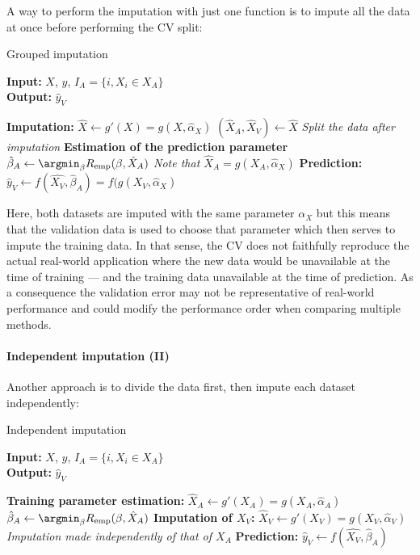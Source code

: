 A way to perform the imputation with just one function is to impute all the data at once before performing the CV split:
\begin{algorithm}[H]
	\caption{Grouped imputation}
	\hspace*{\algorithmicindent} \textbf{Input:} $X$, $y$, $I_A=\{i, X_i \in X_A\}$ \\
 	\hspace*{\algorithmicindent} \textbf{Output:} $\hat{y}_V$
	\begin{algorithmic}[1]
		\State \textbf{Imputation:}
		\Indstate $\hat{X} \leftarrow g'(X) = g(X, \hat{\alpha}_X)$ 
		\Indstate $(\hat{X}_A, \hat{X}_V) \leftarrow \hat{X}$ \Comment \emph{Split the data after imputation}
		\State \textbf{Estimation of the prediction parameter}
		\Indstate $\hat{\beta}_A \leftarrow \argmin_{\beta} R_{\text{emp}}(\beta,\hat{X}_A)$ \Comment \emph{Note that $\hat{X}_A = g(X_A, \hat{\alpha}_X)$}
		\State \textbf{Prediction:}
		\Indstate $\hat{y}_V \leftarrow f(\hat{X_V}, \hat{\beta}_A) = f(g(X_V, \hat{\alpha}_X)$
	\end{algorithmic}
\end{algorithm}

Here, both datasets are imputed with the same parameter $\alpha_X$ but this means that the validation data is used to choose that parameter which then serves to impute the training data. In that sense, the CV does not faithfully reproduce the actual real-world application where the new data would be unavailable at the time of training --- and the training data unavailable at the time of prediction. As a consequence the validation error may not be representative of real-world performance and could modify the performance order when comparing multiple methods.

\paragraph{Independent imputation (II)}
Another approach is to divide the data first, then impute each dataset independently:
\begin{algorithm}[H]
	\caption{Independent imputation}
	\hspace*{\algorithmicindent} \textbf{Input:} $X$, $y$, $I_A=\{i, X_i \in X_A\}$ \\
 	\hspace*{\algorithmicindent} \textbf{Output:} $\hat{y}_V$
	\begin{algorithmic}[1]
		\State \textbf{Training parameter estimation:}
		\Indstate $\hat{X}_A \leftarrow g'(X_A) = g(X_A, \hat{\alpha}_A)$
		\Indstate $\hat{\beta}_A \leftarrow \argmin_{\beta} R_{\text{emp}}(\beta,\hat{X}_A)$
		\State \textbf{Imputation of $X_V$:}
		\Indstate $\hat{X}_V \leftarrow g'(X_V) = g(X_V, \hat{\alpha}_V)$ \Comment \emph{Imputation made independently of that of $X_A$}
		\State \textbf{Prediction:}
		\Indstate $\hat{y}_V \leftarrow f(\hat{X_V}, \hat{\beta}_A)$
	\end{algorithmic}
\end{algorithm}

